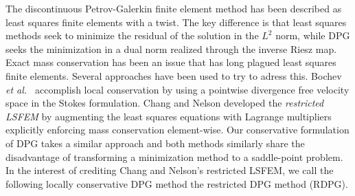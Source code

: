 \documentclass[letterpaper]{article}
\def\etal{{\it et al.~}}
\begin{document}
The discontinuous Petrov-Galerkin finite element method has been described as
least squares finite elements with a twist. The key difference is that least
squares methods seek to minimize the residual of the solution in the $L^2$
norm, while DPG seeks the minimization in a dual norm realized through the
inverse Riesz map. Exact mass conservation has been an issue that has long plagued
least squares finite elements. Several approaches have been
used to try to adress this. Bochev \etal\cite{Bochev2010} accomplish local
conservation by using a pointwise divergence free velocity space in the Stokes
formulation.  Chang and Nelson\cite{ChangNelson1997} developed the
\emph{restricted LSFEM}\cite{ChangNelson1997} by augmenting the least squares
equations with Lagrange multipliers explicitly enforcing mass conservation
element-wise. Our conservative formulation of DPG takes a similar approach and
both methods similarly share the disadvantage of transforming a minimization method to a
saddle-point problem. In the interest of crediting Chang and Nelson's
restricted LSFEM, we call the following locally conservative DPG method the
restricted DPG method (RDPG).
\end{document}
